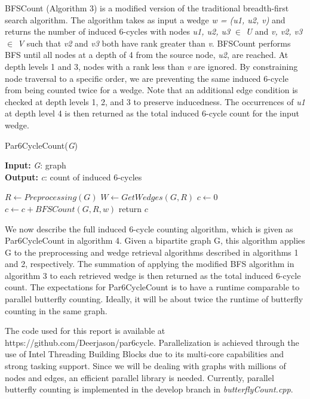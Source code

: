 \documentclass[11pt]{article}
\begin{document}
BFSCount (Algorithm 3) is a modified version of the traditional breadth-first search algorithm.
The algorithm takes as input a wedge \textit{w = (u1, u2, v)} and returns the number of induced 6-cycles with nodes \textit{u1, u2, u3} $\in$ \textit{U} and \textit{v, v2, v3} $\in$ \textit{V} such that \textit{v2} and \textit{v3} both have rank greater than \textit{v}.
BFSCount performs BFS until all nodes at a depth of 4 from the source node, \textit{u2}, are reached.
At depth levels 1 and 3, nodes with a rank less than \textit{v} are ignored.
By constraining node traversal to a specific order, we are preventing the same induced 6-cycle from being counted twice for a wedge.
Note that an additional edge condition is checked at depth levels 1, 2, and 3 to preserve inducedness.
The occurrences of \textit{u1} at depth level 4 is then returned as the total induced 6-cycle count for the input wedge.

\begin{algorithm}[H]
\caption{Par6CycleCount(\textit{G})}
\hspace*{\algorithmicindent} \textbf{Input:} \textit{G}: graph \\
\hspace*{\algorithmicindent} \textbf{Output:} \textit{c}: count of induced 6-cycles
\begin{algorithmic}[1]
    \State $R \gets Preprocessing(G)$
    \State $W \gets GetWedges(G, R)$
    \State $c \gets $0
        \State $c \gets c + BFSCount(G, R, w)$
    \EndFor
    \State return $c$
\end{algorithmic}
\end{algorithm}

We now describe the full induced 6-cycle counting algorithm, which is given as Par6CycleCount in algorithm 4.
Given a bipartite graph G, this algorithm applies G to the preprocessing and wedge retrieval algorithms described in algorithms 1 and 2, respectively.
The summation of applying the modified BFS algorithm in algorithm 3 to each retrieved wedge is then returned as the total induced 6-cycle count.
The expectations for Par6CycleCount is to have a runtime comparable to parallel butterfly counting.
Ideally, it will be about twice the runtime of butterfly counting in the same graph.

The code used for this report is available at https://github.com/Deerjason/par6cycle.
Parallelization is achieved through the use of Intel Threading Building Blocks due to its multi-core capabilities and strong tasking support.
Since we will be dealing with graphs with millions of nodes and edges, an efficient parallel library is needed.
Currently, parallel butterfly counting is implemented in the develop branch in \textit{butterflyCount.cpp}.

{}

\end{document}
